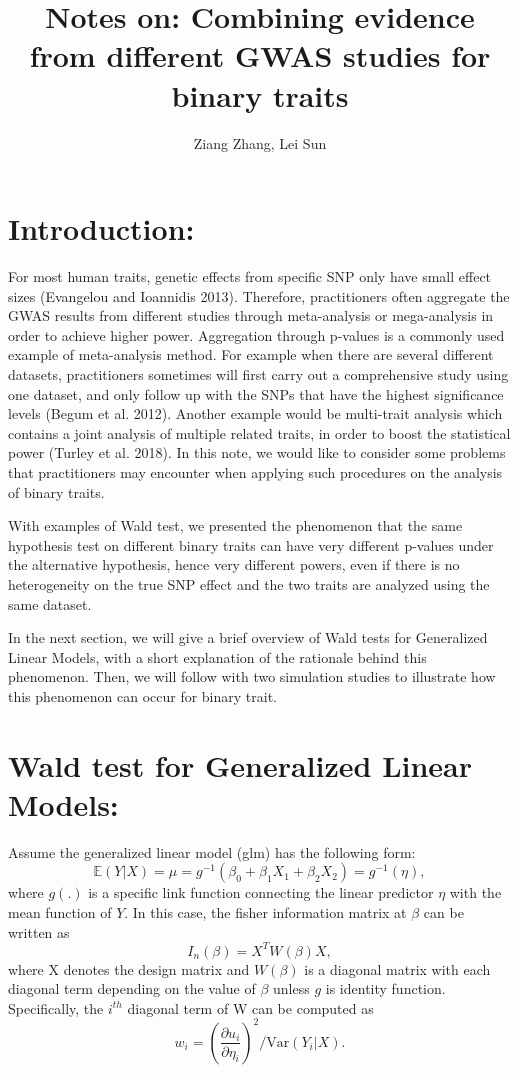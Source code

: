 \documentclass[
]{article}
\title{\textbf{Notes on: Combining evidence from different GWAS studies
for binary traits}}
\author{Ziang Zhang, Lei Sun}
\date{}
\begin{document}
\maketitle

\newcommand{\p}{\text{P}}
\newcommand{\E}{\mathbb{E}}
\newcommand{\Var}{\text{Var}}

\hypertarget{introduction}{%
\section{Introduction:}\label{introduction}}

For most human traits, genetic effects from specific SNP only have small
effect sizes (Evangelou and Ioannidis 2013). Therefore, practitioners
often aggregate the GWAS results from different studies through
meta-analysis or mega-analysis in order to achieve higher power.
Aggregation through p-values is a commonly used example of meta-analysis
method. For example when there are several different datasets,
practitioners sometimes will first carry out a comprehensive study using
one dataset, and only follow up with the SNPs that have the highest
significance levels (Begum et al. 2012). Another example would be
multi-trait analysis which contains a joint analysis of multiple related
traits, in order to boost the statistical power (Turley et al. 2018). In
this note, we would like to consider some problems that practitioners
may encounter when applying such procedures on the analysis of binary
traits.

With examples of Wald test, we presented the phenomenon that the same
hypothesis test on different binary traits can have very different
p-values under the alternative hypothesis, hence very different powers,
even if there is no heterogeneity on the true SNP effect and the two
traits are analyzed using the same dataset.

In the next section, we will give a brief overview of Wald tests for
Generalized Linear Models, with a short explanation of the rationale
behind this phenomenon. Then, we will follow with two simulation studies
to illustrate how this phenomenon can occur for binary trait.

\hypertarget{wald-test-for-generalized-linear-models}{%
\section{Wald test for Generalized Linear
Models:}\label{wald-test-for-generalized-linear-models}}

Assume the generalized linear model (glm) has the following form:
\[\mathbb{E}(Y|X) = \mu = g^{-1}(\beta_0 + \beta_1 X_1 + \beta_2X_2) = g^{-1}(\eta),\]
where \(g(.)\) is a specific link function connecting the linear
predictor \(\eta\) with the mean function of \(Y\). In this case, the
fisher information matrix at \(\beta\) can be written as
\[I_n(\beta) = X^TW(\beta) X,\] where X denotes the design matrix and
\(W(\beta)\) is a diagonal matrix with each diagonal term depending on
the value of \(\beta\) unless \(g\) is identity function. Specifically,
the \(i^{th}\) diagonal term of W can be computed as
\[w_i=(\frac{\partial u_i}{\partial\eta_i})^2/\text{Var}(Y_i|X).\]
\end{document}
